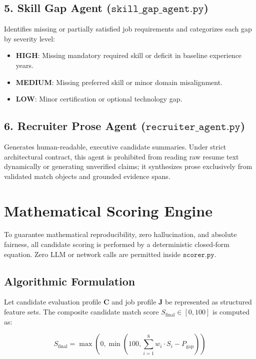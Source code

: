 \documentclass[conference]{IEEEtran}
\begin{document}
\subsection{5. Skill Gap Agent ($\texttt{skill\_gap\_agent.py}$)}
Identifies missing or partially satisfied job requirements and categorizes each gap by severity level:
\begin{itemize}
    \item \textbf{HIGH}: Missing mandatory required skill or deficit in baseline experience years.
    \item \textbf{MEDIUM}: Missing preferred skill or minor domain misalignment.
    \item \textbf{LOW}: Minor certification or optional technology gap.
\end{itemize}

\subsection{6. Recruiter Prose Agent ($\texttt{recruiter\_agent.py}$)}
Generates human-readable, executive candidate summaries. Under strict architectural contract, this agent is prohibited from reading raw resume text dynamically or generating unverified claims; it synthesizes prose exclusively from validated match objects and grounded evidence spans.

\section{Mathematical Scoring Engine}
\label{sec:scoring}
To guarantee mathematical reproducibility, zero hallucination, and absolute fairness, all candidate scoring is performed by a deterministic closed-form equation. Zero LLM or network calls are permitted inside $\texttt{scorer.py}$.

\subsection{Algorithmic Formulation}
Let candidate evaluation profile $\mathbf{C}$ and job profile $\mathbf{J}$ be represented as structured feature sets. The composite candidate match score $S_{\text{final}} \in [0, 100]$ is computed as:

\begin{equation}
S_{\text{final}} = \max\left(0, \min\left(100, \sum_{i=1}^{8} w_i \cdot S_i - P_{\text{gap}}\right)\right)
\label{eq:score}
\end{equation}
\end{document}
